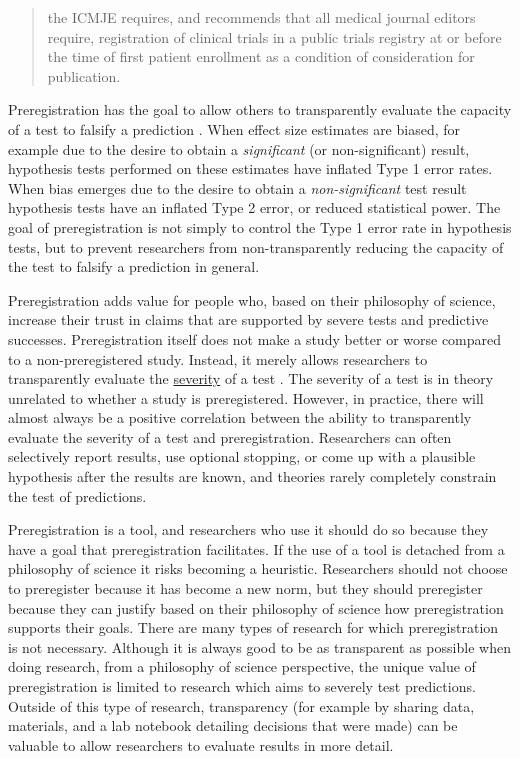 \documentclass[
  oneside]{book}
\begin{document}
\begin{quote}
the ICMJE requires, and recommends that all medical journal editors require, registration of clinical trials in a public trials registry at or before the time of first patient enrollment as a condition of consideration for publication.
\end{quote}

Preregistration has the goal to allow others to transparently evaluate the capacity of a test to falsify a prediction \citep{lakens_value_2019}. When effect size estimates are biased, for example due to the desire to obtain a \emph{significant} (or non-significant) result, hypothesis tests performed on these estimates have inflated Type 1 error rates. When bias emerges due to the desire to obtain a \emph{non-significant} test result hypothesis tests have an inflated Type 2 error, or reduced statistical power. The goal of preregistration is not simply to control the Type 1 error rate in hypothesis tests, but to prevent researchers from non-transparently reducing the capacity of the test to falsify a prediction in general.

Preregistration adds value for people who, based on their philosophy of science, increase their trust in claims that are supported by severe tests and predictive successes. Preregistration itself does not make a study better or worse compared to a non-preregistered study. Instead, it merely allows researchers to transparently evaluate the \protect\hyperlink{severity}{severity} of a test \citep{lakens_value_2019}. The severity of a test is in theory unrelated to whether a study is preregistered. However, in practice, there will almost always be a positive correlation between the ability to transparently evaluate the severity of a test and preregistration. Researchers can often selectively report results, use optional stopping, or come up with a plausible hypothesis after the results are known, and theories rarely completely constrain the test of predictions.

Preregistration is a tool, and researchers who use it should do so because they have a goal that preregistration facilitates. If the use of a tool is detached from a philosophy of science it risks becoming a heuristic. Researchers should not choose to preregister because it has become a new norm, but they should preregister because they can justify based on their philosophy of science how preregistration supports their goals. There are many types of research for which preregistration is not necessary. Although it is always good to be as transparent as possible when doing research, from a philosophy of science perspective, the unique value of preregistration is limited to research which aims to severely test predictions. Outside of this type of research, transparency (for example by sharing data, materials, and a lab notebook detailing decisions that were made) can be valuable to allow researchers to evaluate results in more detail.
\end{document}
